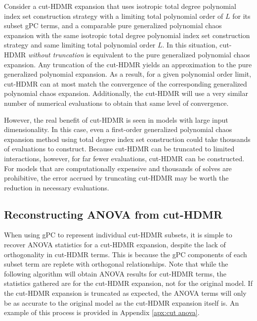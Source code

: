 Consider a cut-HDMR expansion that uses isotropic total degree polynomial index set construction strategy with
a limiting total polynomial order of $L$ for its subset gPC terms, and a comparable pure generalized polynomial
chaos expansion with the same isotropic total degree polynomial index set construction strategy and same
limiting total polynomial order $L$.  In this situation, cut-HDMR \emph{without truncation} is equivalent to
the pure generalized polynomial chaos expansion.  Any truncation of the cut-HDMR yields an approximation to
the pure generalized polynomial expansion.  As a result, for a given polynomial order limit, cut-HDMR can at
most match the convergence of the corresponding generalized polynomial chaos expansion.  Additionally, the
cut-HDMR will use a very similar number of numerical evaluations to obtain that same level of convergence.

However, the real benefit of cut-HDMR is seen in models with large input dimensionality.  In this case, even a
first-order generalized polynomial chaos expansion method using total degree index set construction could take
thousands of evaluations to construct.  Because cut-HDMR can be truncated to limited interactions, however,
for far fewer evaluations, cut-HDMR can be constructed.  For models that are computationally expensive and
thousands of solves are
prohibitive, the error accrued by truncating cut-HDMR may be worth the reduction in necessary evaluations.

\subsection{Reconstructing ANOVA from cut-HDMR}
When using gPC to represent individual cut-HDMR subsets, it is simple to recover ANOVA statistics for a
cut-HDMR expansion, despite the lack of orthogonality in cut-HDMR terms.  This is because the gPC components
of each subset term are replete with orthogonal relationships.  Note that while the following algorithm will
obtain ANOVA results for cut-HDMR terms, the statistics gathered are for the cut-HDMR expansion, not for the
original model.  If the cut-HDMR expansion is truncated as expected, the ANOVA terms will only be as accurate
to the original model as the cut-HDMR expansion itself is.  An example of this process is provided in Appendix
\ref{apx:cut anova}.

